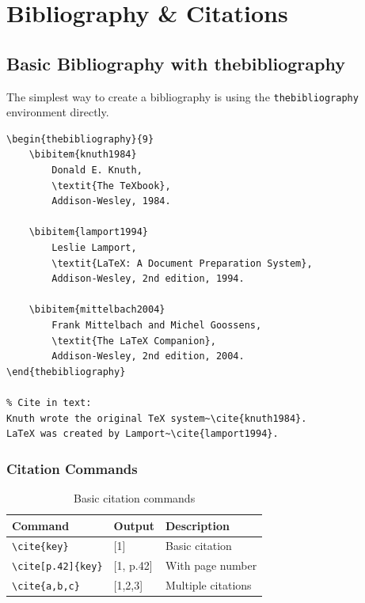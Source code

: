 
\chapter{Bibliography \& Citations}

\section{Basic Bibliography with thebibliography}

The simplest way to create a bibliography is using the \texttt{thebibliography} environment directly.

\begin{lstlisting}[language={[LaTeX]TeX}, caption=thebibliography environment]
% At the end of your document (before ):
\begin{thebibliography}{9}
    \bibitem{knuth1984}
        Donald E. Knuth,
        \textit{The TeXbook},
        Addison-Wesley, 1984.

    \bibitem{lamport1994}
        Leslie Lamport,
        \textit{LaTeX: A Document Preparation System},
        Addison-Wesley, 2nd edition, 1994.

    \bibitem{mittelbach2004}
        Frank Mittelbach and Michel Goossens,
        \textit{The LaTeX Companion},
        Addison-Wesley, 2nd edition, 2004.
\end{thebibliography}

% Cite in text:
Knuth wrote the original TeX system~\cite{knuth1984}.
LaTeX was created by Lamport~\cite{lamport1994}.
\end{lstlisting}

\subsection{Citation Commands}

\begin{table}[H]
\centering
\begin{tabular}{lll}
\toprule
\textbf{Command} & \textbf{Output} & \textbf{Description} \\
\midrule
\verb|\cite{key}|         & [1]          & Basic citation \\
\verb|\cite[p.42]{key}|   & [1, p.42]    & With page number \\
\verb|\cite{a,b,c}|       & [1,2,3]      & Multiple citations \\
\bottomrule
\end{tabular}
\caption{Basic citation commands}
\end{table}

